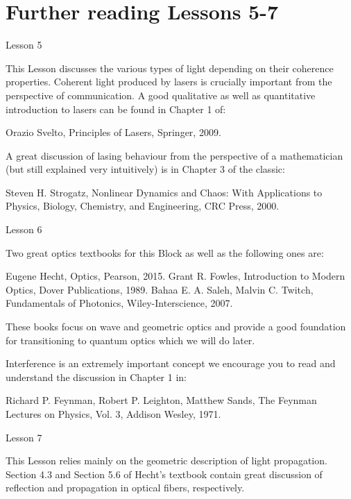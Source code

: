 \section*{Further reading Lessons 5-7}

Lesson 5

This Lesson discusses the various types of light depending on their coherence properties. Coherent light produced by lasers is crucially important from the perspective of communication. A good qualitative as well as quantitative introduction to lasers can be found in Chapter 1 of:

Orazio Svelto, Principles of Lasers, Springer, 2009.

A great discussion of lasing behaviour from the perspective of a mathematician (but still explained very intuitively) is in Chapter 3 of the classic:

Steven H. Strogatz, Nonlinear Dynamics and Chaos: With Applications to Physics, Biology, Chemistry, and Engineering, CRC Press, 2000.

Lesson 6

Two great optics textbooks for this Block as well as the following ones are:

Eugene Hecht, Optics, Pearson, 2015.
Grant R. Fowles, Introduction to Modern Optics, Dover Publications, 1989.
Bahaa E. A. Saleh, Malvin C. Twitch, Fundamentals of Photonics, Wiley-Interscience, 2007.

These books focus on wave and geometric optics and provide a good foundation for transitioning to quantum optics which we will do later.

Interference is an extremely important concept we encourage you to read and understand the discussion in Chapter 1 in:

Richard P. Feynman, Robert P. Leighton, Matthew Sands, The Feynman Lectures on Physics, Vol. 3, Addison Wesley, 1971.

Lesson 7

This Lesson relies mainly on the geometric description of light propagation. Section 4.3 and Section 5.6 of Hecht’s textbook contain great discussion of reflection and propagation in optical fibers, respectively.
